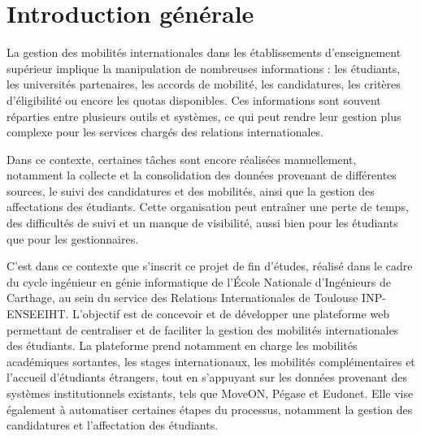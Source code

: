 \chapter*{Introduction générale}
\justifying

La gestion des mobilités internationales dans les établissements d'enseignement supérieur implique la manipulation de nombreuses informations : les étudiants, les universités partenaires, les accords de mobilité, les candidatures, les critères d'éligibilité ou encore les quotas disponibles. Ces informations sont souvent réparties entre plusieurs outils et systèmes, ce qui peut rendre leur gestion plus complexe pour les services chargés des relations internationales.

Dans ce contexte, certaines tâches sont encore réalisées manuellement, notamment la collecte et la consolidation des données provenant de différentes sources, le suivi des candidatures et des mobilités, ainsi que la gestion des affectations des étudiants. Cette organisation peut entraîner une perte de temps, des difficultés de suivi et un manque de visibilité, aussi bien pour les étudiants que pour les gestionnaires.

C'est dans ce contexte que s'inscrit ce projet de fin d'études, réalisé dans le cadre du cycle ingénieur en génie informatique de l'École Nationale d'Ingénieurs de Carthage, au sein du service des Relations Internationales de Toulouse INP-ENSEEIHT. L'objectif est de concevoir et de développer une plateforme web permettant de centraliser et de faciliter la gestion des mobilités internationales des étudiants. La plateforme prend notamment en charge les mobilités académiques sortantes, les stages internationaux, les mobilités complémentaires et l'accueil d'étudiants étrangers, tout en s'appuyant sur les données provenant des systèmes institutionnels existants, tels que MoveON, Pégase et Eudonet. Elle vise également à automatiser certaines étapes du processus, notamment la gestion des candidatures et l'affectation des étudiants.

